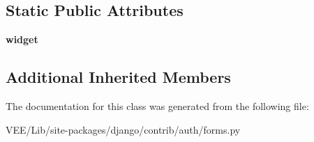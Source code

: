 \subsection*{Static Public Attributes}
\begin{DoxyCompactItemize}
\item 
\mbox{\label{classdjango_1_1contrib_1_1auth_1_1forms_1_1_read_only_password_hash_field_a22ad5f2259d3853bd2f2ca21346767d8}} 
{\bfseries widget}
\end{DoxyCompactItemize}
\subsection*{Additional Inherited Members}


The documentation for this class was generated from the following file\+:\begin{DoxyCompactItemize}
\item 
V\+E\+E/\+Lib/site-\/packages/django/contrib/auth/forms.\+py\end{DoxyCompactItemize}
